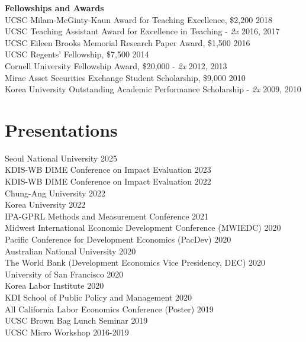 \documentclass[letterpaper, margin, 10pt]{res} %
\begin{document}
\begin{resume}
{\bf Fellowships and Awards}\\
UCSC Milam-McGinty-Kaun Award for Teaching Excellence, \$2,200  \hfill{2018}\\
UCSC Teaching Assistant Award for Excellence in Teaching -  \textit{2x}   \hfill{2016, 2017}\\
UCSC Eileen Brooks Memorial Research Paper Award, \$1,500  \hfill{2016}\\
UCSC Regents' Fellowship, \$7,500 \hfill{2014}\\
Cornell University Fellowship Award, \$20,000 -  \textit{2x} \hfill{2012, 2013}\\
Mirae Asset Securities Exchange Student Scholarship, \$9,000 \hfill{2010}\\
Korea University Outstanding Academic Performance Scholarship -  \textit{2x} \hfill{2009, 2010}


\section{Presentations}
Seoul National University \hfill{2025} \\
KDIS-WB DIME Conference on Impact Evaluation  \hfill{2023}\\
KDIS-WB DIME Conference on Impact Evaluation  \hfill{2022}\\
Chung-Ang University  \hfill{2022}\\
Korea University  \hfill{2022}\\
IPA-GPRL Methods and Measurement Conference  \hfill{2021}\\
Midwest International Economic Development Conference (MWIEDC)  \hfill{2020}\\
Pacific Conference for Development Economics (PacDev) \hfill{2020}\\
Australian National University \hfill{2020}\\
The World Bank (Development Economics Vice Presidency, DEC) \hfill{2020}\\
University of San Francisco \hfill{2020}\\
Korea Labor Institute \hfill{2020}\\
KDI School of Public Policy and Management \hfill{2020}\\
All California Labor Economics Conference (Poster)   \hfill{2019}\\
UCSC Brown Bag Lunch Seminar  \hfill{2019}\\
UCSC Micro Workshop \hfill{2016-2019}



\end{resume}
\end{document}
